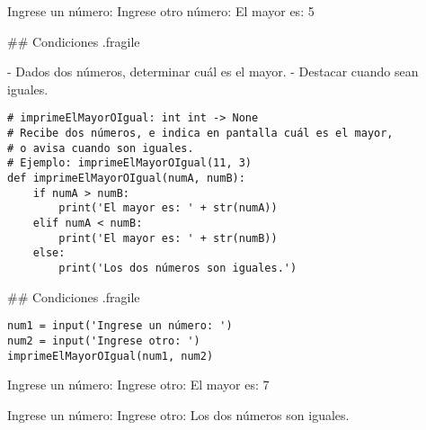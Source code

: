 

\begin{exampleConsole}
Ingrese un número: 
Ingrese otro número: 
El mayor es: 5
\end{exampleConsole}

\trmcolumns

\pause

\vspace{-3ex}


## Condiciones {.fragile}


\vspace{-3ex}

- Dados dos números, determinar cuál es el mayor.
    - \alert{Destacar cuando sean iguales.}

\begin{lstlisting}
# imprimeElMayorOIgual: int int -> None
# Recibe dos números, e indica en pantalla cuál es el mayor,
# o avisa cuando son iguales.
# Ejemplo: imprimeElMayorOIgual(11, 3)
def imprimeElMayorOIgual(numA, numB):
    if numA > numB:
        print('El mayor es: ' + str(numA))
    elif numA < numB:
        print('El mayor es: ' + str(numB))
    else:
        print('Los dos números son iguales.')
\end{lstlisting}

## Condiciones {.fragile}

\vspace{-3ex}

\bgncolumns
{}
\vspace{-1ex}


\begin{lstlisting}
num1 = input('Ingrese un número: ')
num2 = input('Ingrese otro: ')
imprimeElMayorOIgual(num1, num2)
\end{lstlisting}

\vspace{-1ex}


\begin{exampleConsole}
Ingrese un número: 
Ingrese otro: 
El mayor es: 7
\end{exampleConsole}

\fullrule


\begin{exampleConsole}
Ingrese un número: 
Ingrese otro: 
Los dos números son iguales.
\end{exampleConsole}

\trmcolumns
